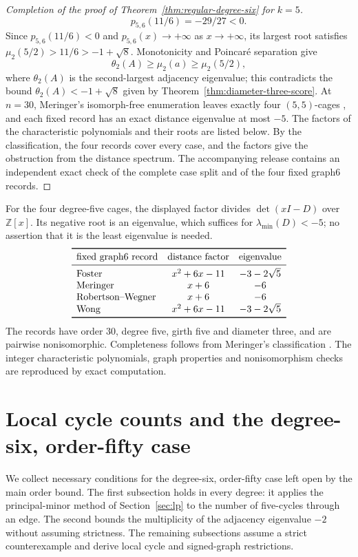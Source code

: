 \documentclass[a4paper,10pt,reqno]{amsart}
\theoremstyle{plain}
\theoremstyle{definition}
\theoremstyle{remark}
\begin{document}
\begin{proof}[Completion of the proof of Theorem~\ref{thm:regular-degree-six} for \(k=5\)]
\[ \qquad p_{5,6}(11/6)=-29/27<0.
\]
Since \(p_{5,6}(11/6)<0\) and \(p_{5,6}(x)\to+\infty\) as
\(x\to+\infty\), its largest root satisfies
\(\mu_2(5/2)>11/6>-1+\sqrt8\).  Monotonicity and Poincaré separation give
\[
 \theta_2(A)\ge\mu_2(a)\ge\mu_2(5/2),
\]
where \(\theta_2(A)\) is the second-largest adjacency eigenvalue; this
contradicts the bound \(\theta_2(A)<-1+\sqrt8\) given by
Theorem~\ref{thm:diameter-three-score}.  At \(n=30\),
Meringer's isomorph-free enumeration leaves exactly four
\((5,5)\)-cages \cite[p.~142]{Meringer1999}, and each fixed record has an exact
distance eigenvalue at most \(-5\). The factors of the characteristic
polynomials and their roots are listed below. By the classification, the four
records cover every case, and the factors give the obstruction from the
distance spectrum.
The accompanying release contains an independent exact check of the complete
case split and of the four fixed graph6 records.
\end{proof}

For the four degree-five cages, the displayed factor divides
\(\det(xI-D)\) over \(\mathbb Z[x]\). Its negative root is an eigenvalue,
which suffices for \(\lambda_{\min}(D)<-5\); no assertion that it is the
least eigenvalue is needed.
\[
\begin{array}{lcc}
\toprule
\text{fixed graph6 record}&\text{distance factor}&\text{eigenvalue}\\
\midrule
\text{Foster}&x^2+6x-11&-3-2\sqrt5\\
\text{Meringer}&x+6&-6\\
\text{Robertson--Wegner}&x+6&-6\\
\text{Wong}&x^2+6x-11&-3-2\sqrt5\\
\bottomrule
\end{array}
\]
The records have order \(30\), degree five, girth five and diameter three,
and are pairwise nonisomorphic. Completeness follows from Meringer's
classification \cite[p.~142]{Meringer1999}.
The integer characteristic polynomials, graph properties and
nonisomorphism checks are reproduced by exact computation.

\section{Local cycle counts and the degree-six, order-fifty case}
\label{app:order50-details}

We collect necessary conditions for the degree-six, order-fifty case left
open by the main order bound. The first subsection holds in every degree:
it applies the principal-minor method of Section~\ref{sec:lp} to the
number of five-cycles through an edge. The second bounds the multiplicity
of the adjacency eigenvalue \(-2\) without assuming strictness. The
remaining subsections assume a strict counterexample and derive local
cycle and signed-graph restrictions.
\end{document}
